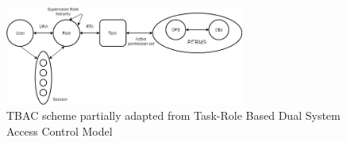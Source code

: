 \begin{figure}[ht]
    \centering
    \includegraphics[width=0.7\textwidth, height=0.39\textwidth]{Img/self/TBAC.jpg}
    \caption{TBAC scheme partially adapted from Task-Role Based Dual System Access Control Model\cite{TBAC2}}
\end{figure}


